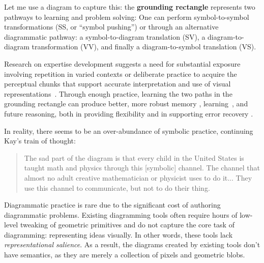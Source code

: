 Let me use a diagram to capture this: the \textbf{grounding rectangle} represents two pathways to learning and problem solving: One can perform symbol-to-symbol transformations (SS, or “symbol pushing”) or through an \textcolor[HTML]{8C91C2}{alternative diagrammatic pathway}: a symbol-to-diagram translation (SV), a diagram-to-diagram transformation (VV), and finally a diagram-to-symbol translation (VS).

Research on expertise development suggests a need for substantial exposure involving repetition in varied contexts or deliberate practice \cite{deliberatePractice} to acquire the perceptual chunks \cite{chunkingModels, perceptualLearningExpertise} that support accurate interpretation and use of visual representations~\cite{Koedinger1990a}. Through enough practice, learning the two paths in the grounding rectangle can produce better, more robust memory \cite{dualCoding}, learning~\cite{multipleReps, multimediaLearning, cotraining}, and future reasoning, both in providing flexibility and in supporting error recovery \cite{groundedAndAbstractReps}.

In reality, there seems to be an over-abundance of symbolic practice, continuing Kay's train of thought:

\begin{quote}
    The sad part of the diagram is that every child in the United States is taught math and physics through this [symbolic] channel. The channel that almost no adult creative mathematician or physicist uses to do it... They use this channel to communicate, but not to do their thing.
\end{quote}

Diagrammatic practice is rare due to the significant cost of authoring diagrammatic problems. Existing diagramming tools often require hours of low-level tweaking of geometric primitives and do not capture the core task of diagramming: representing ideas visually. In other words, these tools lack \emph{representational salience}. As a result, the diagrams created by existing tools don't have semantics, as they are merely a collection of pixels and geometric blobs.  


